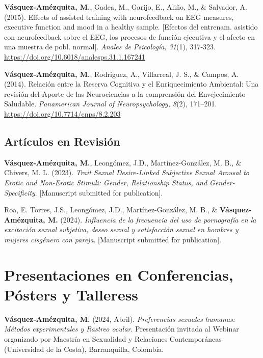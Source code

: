 \documentclass[11pt,a4paper,]{awesome-cv}
\begin{document}
\textbf{Vásquez-Amézquita, M.}, Gadea, M., Garijo, E., Aliño, M., \&
Salvador, A. (2015). Effects of assisted training with neurofeedback on
EEG measures, executive function and mood in a healthy sample.
{[}Efectos del entrenam. asistido con neurofeedback sobre el EEG, los
procesos de función ejecutiva y el afecto en una muestra de pobl.
normal{]}. \emph{Anales de Psicología, 31}(1), 317-323.
\url{https://doi.org/10.6018/analesps.31.1.167241}

\textbf{Vásquez-Amézquita, M.}, Rodriguez, A., Villarreal, J. S., \&
Campos, A. (2014). Relación entre la Reserva Cognitiva y el
Enriquecimiento Ambiental: Una revisión del Aporte de las Neurociencias
a la comprensión del Envejecimiento Saludable. \emph{Panamerican Journal
of Neuropsychology, 8}(2), 171--201.
\url{https://doi.org/10.7714/cnps/8.2.203}

\endgroup

\subsection{\texorpdfstring{\textbf{Artículos en Revisión}}{}}\label{section-1}

\begingroup
\footnotesize
\setlength{\parindent}{-0.5in}
\setlength{\leftskip}{0.5in}

\textbf{Vásquez-Amézquita, M.}, Leongómez, J.D., Martínez-González, M.
B., \& Chivers, M. L. (2023). \emph{Trait Sexual Desire-Linked
Subjective Sexual Arousal to Erotic and Non-Erotic Stimuli: Gender,
Relationship Status, and Gender-Specificity}. {[}Manuscript submitted
for publication{]}.

Roa, E. Torres, J.S., Leongómez, J.D., Martínez-González, M. B., \&
\textbf{Vásquez-Amézquita, M.} (2024). \emph{Influencia de la frecuencia
del uso de pornografía en la excitación sexual subjetiva, deseo sexual y
satisfacción sexual en hombres y mujeres cisgénero con pareja}.
{[}Manuscript submitted for publication{]}.

\endgroup

\section{Presentaciones en Conferencias, Pósters y
Talleress}\label{presentaciones-en-conferencias-puxf3sters-y-talleress}

\begingroup
\footnotesize
\setlength{\parindent}{-0.5in}
\setlength{\leftskip}{0.5in}

\textbf{Vásquez-Amézquita, M.} (2024, Abril). \emph{Preferencias
sexuales humanas: Métodos experimentales y Rastreo ocular}. Presentación
invitada al Webinar organizado por Maestría en Sexualidad y Relaciones
Contemporáneas (Universidad de la Costa), Barranquilla, Colombia.
\end{document}
